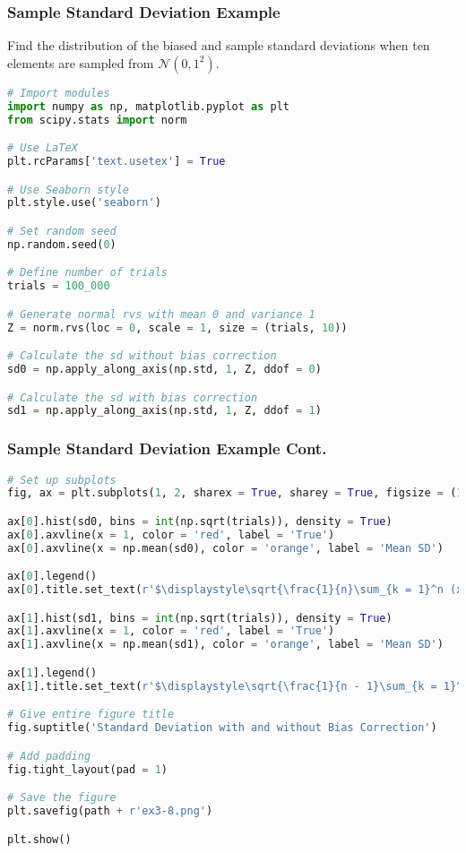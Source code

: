 \documentclass{beamer}
\begin{document}
\begin{frame}[fragile]
\frametitle{Sample Standard Deviation Example}
\small 
\begin{Example}
Find the distribution of the biased and sample standard deviations when ten elements are sampled from $\mathcal{N}(0, 1^2)$.
\end{Example}

\begin{lstlisting}[language=Python]
# Import modules
import numpy as np, matplotlib.pyplot as plt
from scipy.stats import norm

# Use LaTeX
plt.rcParams['text.usetex'] = True

# Use Seaborn style
plt.style.use('seaborn')

# Set random seed
np.random.seed(0)

# Define number of trials
trials = 100_000

# Generate normal rvs with mean 0 and variance 1
Z = norm.rvs(loc = 0, scale = 1, size = (trials, 10))

# Calculate the sd without bias correction
sd0 = np.apply_along_axis(np.std, 1, Z, ddof = 0)

# Calculate the sd with bias correction
sd1 = np.apply_along_axis(np.std, 1, Z, ddof = 1)
\end{lstlisting}


\end{frame}

\begin{frame}[fragile]
\frametitle{Sample Standard Deviation Example Cont.}

\begin{lstlisting}[language=Python]
# Set up subplots
fig, ax = plt.subplots(1, 2, sharex = True, sharey = True, figsize = (15, 5), dpi = 125)

ax[0].hist(sd0, bins = int(np.sqrt(trials)), density = True)
ax[0].axvline(x = 1, color = 'red', label = 'True')
ax[0].axvline(x = np.mean(sd0), color = 'orange', label = 'Mean SD')

ax[0].legend()
ax[0].title.set_text(r'$\displaystyle\sqrt{\frac{1}{n}\sum_{k = 1}^n (x_k - \bar{x})^2}$')

ax[1].hist(sd1, bins = int(np.sqrt(trials)), density = True)
ax[1].axvline(x = 1, color = 'red', label = 'True')
ax[1].axvline(x = np.mean(sd1), color = 'orange', label = 'Mean SD')

ax[1].legend()
ax[1].title.set_text(r'$\displaystyle\sqrt{\frac{1}{n - 1}\sum_{k = 1}^n (x_k - \bar{x})^2}$')

# Give entire figure title
fig.suptitle('Standard Deviation with and without Bias Correction')

# Add padding
fig.tight_layout(pad = 1)

# Save the figure
plt.savefig(path + r'ex3-8.png')

plt.show()
\end{lstlisting}

\end{frame}
\end{document}
